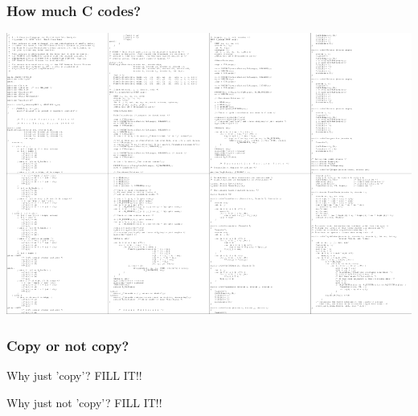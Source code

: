 \documentclass{beamer}
\begin{document}

\begin{frame}[fragile]
\frametitle{How much \textbf{C} codes?}
\begin{center}
\includegraphics{plot/code.png}
\end{center}
\end{frame}




\begin{frame}[fragile]
\frametitle{Copy or not copy?}
\begin{block}{Why just 'copy'?}
FILL IT!!
\end{block}

\begin{block}{Why just not 'copy'?}
FILL IT!!
\end{block}
\end{frame}


\end{document}

